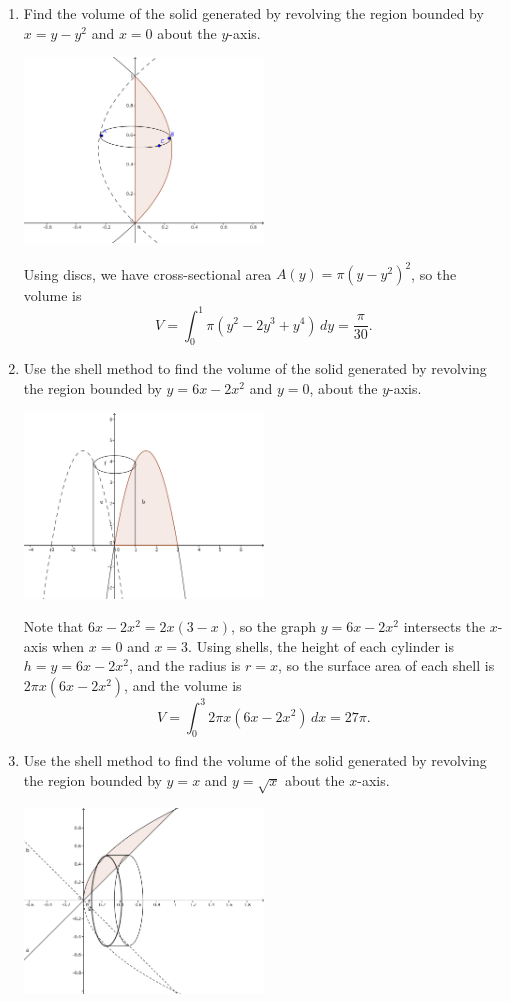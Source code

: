 \documentclass[12pt]{article}
\begin{document}
\begin{enumerate}
 \item Find the volume of the solid generated by revolving the region bounded by $x=y-y^2$ and $x=0$ about the $y$-axis.
\begin{center}
 \includegraphics[width=0.5\textwidth]{WS5-4.png}
\end{center}

Using discs, we have cross-sectional area $A(y) = \pi(y-y^2)^2$, so the volume is
\[
 V = \int_0^1 \pi(y^2-2y^3+y^4)\,dy = \frac{\pi}{30}.
\]


 \item Use the shell method to find the volume of the solid generated by revolving the region bounded by $y=6x-2x^2$ and $y=0$, about the $y$-axis.

\begin{center}
 \includegraphics[width=0.5\textwidth]{WS5-5.png}
\end{center}

Note that $6x-2x^2=2x(3-x)$, so the graph $y=6x-2x^2$ intersects the $x$-axis when $x=0$ and $x=3$. Using shells, the height of each cylinder is $h = y = 6x-2x^2$, and the radius is $r=x$, so the surface area of each shell is $2\pi x(6x-2x^2)$, and the volume is
\[
 V = \int_0^3 2\pi x(6x-2x^2)\,dx  = 27\pi.
\]

 \item Use the shell method to find the volume of the solid generated by revolving the region bounded by $y=x$ and $y=\sqrt{x}$ about the $x$-axis.
\begin{center}
 \includegraphics[width=0.5\textwidth]{WS5-6.png}
\end{center}


\end{enumerate}
\end{document}
